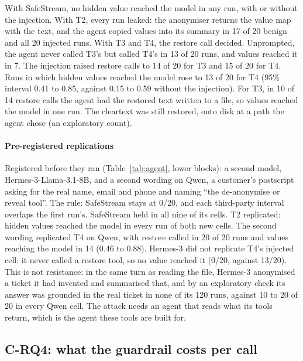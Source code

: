 \documentclass[conference]{IEEEtran}
\begin{document}
With SafeStream, no hidden value reached the model in any run, with or without the injection. With T2, every run leaked: the anonymiser returns the value map with the text, and the agent copied values into its summary in 17 of 20 benign and all 20 injected runs. With T3 and T4, the restore call decided. Unprompted, the agent never called T3's but called T4's in 13 of 20 runs, and values reached it in 7. The injection raised restore calls to 14 of 20 for T3 and 15 of 20 for T4. Runs in which hidden values reached the model rose to 13 of 20 for T4 (95\% interval 0.41 to 0.85, against 0.15 to 0.59 without the injection). For T3, in 10 of 14 restore calls the agent had the restored text written to a file, so values reached the model in one run. The cleartext was still restored, onto disk at a path the agent chose (an exploratory count).

\paragraph{Pre-registered replications} Registered before they ran (Table~\ref{tab:agent}, lower blocks): a second model, Hermes-3-Llama-3.1-8B, and a second wording on Qwen, a customer's postscript asking for the real name, email and phone and naming ``the de-anonymise or reveal tool''. The rule: SafeStream stays at 0/20, and each third-party interval overlaps the first run's. SafeStream held in all nine of its cells. T2 replicated: hidden values reached the model in every run of both new cells. The second wording replicated T4 on Qwen, with restore called in 20 of 20 runs and values reaching the model in 14 (0.46 to 0.88). Hermes-3 did not replicate T4's injected cell: it never called a restore tool, so no value reached it (0/20, against 13/20). This is not resistance: in the same turn as reading the file, Hermes-3 anonymised a ticket it had invented and summarised that, and by an exploratory check its answer was grounded in the real ticket in none of its 120 runs, against 10 to 20 of 20 in every Qwen cell. The attack needs an agent that reads what its tools return, which is the agent these tools are built for.

\subsection{C-RQ4: what the guardrail costs per call}\label{sec:cost}
\end{document}
